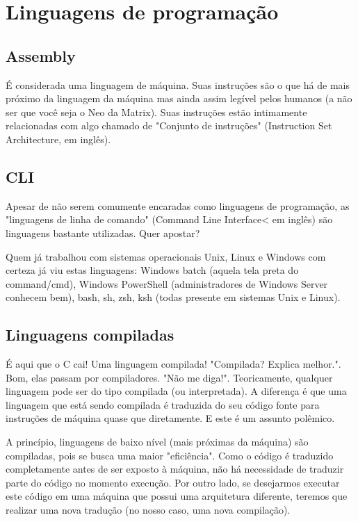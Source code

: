 \section{Linguagens de programação}

\subsection{Assembly}

É considerada uma linguagem de máquina. Suas instruções são o que há de mais próximo da linguagem da máquina mas ainda assim legível pelos humanos (a não ser que você seja o Neo da Matrix). Suas instruções estão intimamente relacionadas com algo chamado de "Conjunto de instruções" (Instruction Set Architecture, em inglês).

\subsection{CLI}

Apesar de não serem comumente encaradas como linguagens de programação, as "linguagens de linha de comando" (Command Line Interface< em inglês) são linguagens bastante utilizadas. Quer apostar?

Quem já trabalhou com sistemas operacionais Unix, Linux e Windows com certeza já viu estas linguagens: Windows batch (aquela tela preta do command/cmd), Windows PowerShell (administradores de Windows Server conhecem bem), bash, sh, zsh, ksh (todas presente em sistemas Unix e Linux).

\subsection{Linguagens compiladas}

É aqui que o C cai! Uma linguagem compilada!
"Compilada? Explica melhor.". Bom, elas passam por compiladores. "Não me diga!".
Teoricamente, qualquer linguagem pode ser do tipo compilada (ou interpretada). A diferença é que uma linguagem que está sendo compilada é traduzida do seu código fonte para instruções de máquina quase que diretamente. E este é um assunto polêmico.

A princípio, linguagens de baixo nível (mais próximas da máquina) são compiladas, pois se busca uma maior "eficiência". Como o código é traduzido completamente antes de ser exposto à máquina, não há necessidade de traduzir parte do código no momento execução. Por outro lado, se desejarmos executar este código em uma máquina que possui uma arquitetura diferente, teremos que realizar uma nova tradução (no nosso caso, uma nova compilação).

